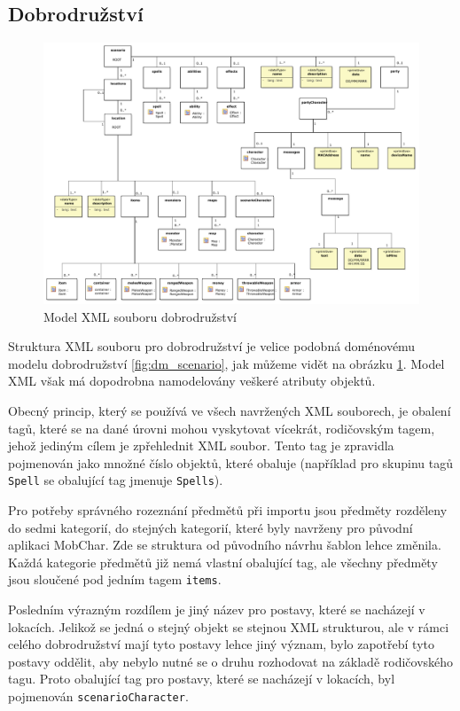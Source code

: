 \documentclass[thesis=B,czech]{resources/FITthesis}[2012/06/26]
\begin{document}
\subsection{Dobrodružství}
\begin{figure}\centering
	\includegraphics[width=1\textwidth]{images/scenarioXML}
	\caption[Model XML souboru dobrodružství]{Model XML souboru dobrodružství}\label{fig:xml_scenario}
\end{figure}
Struktura XML souboru pro dobrodružství je velice podobná doménovému modelu dobrodružství \ref{fig:dm_scenario}, jak můžeme vidět na obrázku \ref{fig:xml_scenario}. Model XML však má dopodrobna namodelovány veškeré atributy objektů. \par

Obecný princip, který se používá ve všech navržených XML souborech, je obalení tagů, které se na dané úrovni mohou vyskytovat vícekrát, rodičovským tagem, jehož jediným cílem je zpřehlednit XML soubor. Tento tag je zpravidla pojmenován jako množné číslo objektů, které obaluje (například pro skupinu tagů \texttt{Spell} se obalující tag jmenuje \texttt{Spells}).

Pro potřeby správného rozeznání předmětů při importu jsou předměty rozděleny do sedmi kategorií, do stejných kategorií, které byly navrženy pro původní aplikaci MobChar. Zde se struktura od původního návrhu šablon lehce změnila. Každá kategorie předmětů již nemá vlastní obalující tag, ale všechny předměty jsou sloučené pod jedním tagem \texttt{items}. \par

Posledním výrazným rozdílem je jiný název pro postavy, které se nacházejí v lokacích. Jelikož se jedná o stejný objekt se stejnou XML strukturou, ale v rámci celého dobrodružství mají tyto postavy lehce jiný význam, bylo zapotřebí tyto postavy oddělit, aby nebylo nutné se o druhu rozhodovat na základě rodičovského tagu. Proto obalující tag pro postavy, které se nacházejí v lokacích, byl pojmenován \texttt{scenarioCharacter}. 
\end{document}
